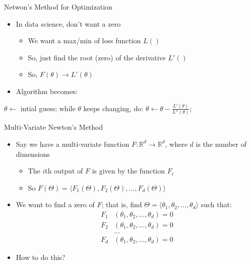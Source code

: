 \documentclass[aspectratio=169]{beamer}
\begin{document}
\begin{frame}[fragile]{Netwon's Method for Optimization}

\begin{itemize}
\item In data science, don't want a zero
	\begin{itemize}
	\item We want a max/min of loss function $L()$
	\item So, just find the root (zero) of the derivative $L'()$
	\item So, $F(\theta) \rightarrow L'(\theta)$
	\end{itemize}
\item Algorithm becomes:
\end{itemize}
\begin{SQL}
$\theta \leftarrow$ intial guess;
while $\theta$ keeps changing, do:
  $\theta \leftarrow \theta - \frac{L'(\theta)}{L''(\theta)}$;
\end{SQL}
\end{frame}
\begin{frame}{Multi-Variate Newton's Method}

\begin{itemize}
\item Say we have a multi-variate function $F: \mathbb{R}^d \rightarrow \mathbb{R}^d$, where $d$ is the number of dimensions
\begin{itemize}
	\item The $i$th output of $F$ is given by the function $F_i$
	\item So $F(\Theta) = \langle F_1(\Theta), F_2(\Theta), ..., F_d(\Theta)\rangle$ %
\end{itemize}
\item We want to find a zero of $F$; that is, find $\Theta = \langle \theta_1, \theta_2, ..., \theta_d \rangle$ such that:
\begin{align}
F_1 &(\theta_1, \theta_2, ..., \theta_d) = 0 \nonumber \\
F_2 &(\theta_1, \theta_2, ..., \theta_d) = 0 \nonumber \\
&... \nonumber \\
F_d &(\theta_1, \theta_2, ..., \theta_d) = 0 \nonumber
\end{align}
\item How to do this?
\end{itemize}
\end{frame}
\end{document}
